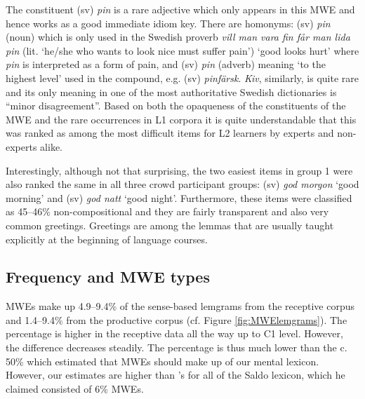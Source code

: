 \documentclass[output=paper,colorlinks,citecolor=brown]{langscibook}
\begin{document}
The constituent (sv) \textit{pin} is a rare adjective which only appears in this MWE and hence works as a good immediate idiom key. There are homonyms: (sv) \textit{pin} (noun) which is only used in the Swedish proverb \textit{vill man vara fin får man lida pin}
(lit. ‘he/she who wants to look nice must suffer pain’) `good looks hurt' where \textit{pin} is interpreted as a form of pain, and (sv) \textit{pin} (adverb) meaning `to the highest level'  
used in the compound, e.g. (sv) \textit{pinfärsk}. 
\textit{Kiv}, similarly, is quite rare and its only meaning in one of the most authoritative Swedish dictionaries \citep{akademien2021svensk} 
is “minor disagreement”. Based on both the opaqueness of the constituents of the MWE and the rare occurrences in L1 corpora it is quite understandable that this was ranked as among the most difficult items for L2 learners by experts and non-experts alike.

Interestingly, although not that surprising, the two easiest items in group 1 were also ranked the same in all three crowd participant groups: (sv) \textit{god morgon} ‘good morning’ and (sv) \textit{god natt} ‘good night’. Furthermore, these items were classified as 45–46\% non-compositional and they are fairly transparent and also very common greetings. Greetings are among the lemmas that are usually taught explicitly at the beginning of language courses.


\subsection{Frequency and MWE types}\label{sec:FreqMWEtype}

MWEs make up 4.9–9.4\% of the sense-based lemgrams from the receptive corpus and 1.4–9.4\% from the productive corpus (cf. Figure  \ref{fig:MWElemgrams}).
The percentage is higher in the receptive data all the way up to C1 level. However, the difference decreases steadily. The percentage is thus much lower than the c. 50\% which \citet{jackendoff1997architecture} estimated that MWEs should make up of our mental lexicon. However, our estimates are higher than \citet{borin2021multiword}'s for all of the Saldo lexicon, which he claimed consisted of 6\% MWEs.
\end{document}
